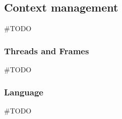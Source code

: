 \subsection{Context management}
\#TODO

\subsubsection{Threads and Frames}
\#TODO

\subsubsection{Language}
\#TODO
